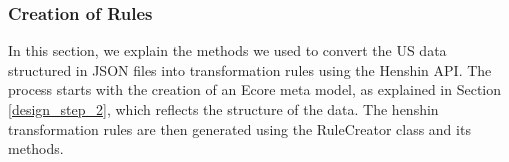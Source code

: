 %	
\subsubsection*{Creation of Rules}\label{step_creation_of_ruels}
In this section, we explain the methods we used to convert the US data structured in JSON files into transformation rules using the Henshin API. The process starts with the creation of an Ecore meta model, as explained in Section \ref{design_step_2}, which reflects the structure of the data. The henshin transformation rules are then generated using the RuleCreator class and its methods.

